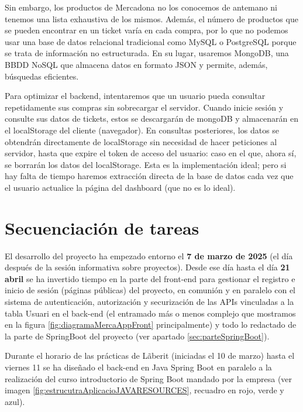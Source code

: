 \documentclass[a4paper,12pt]{report}
\begin{document}
		Sin embargo, los productos de Mercadona no los conocemos de antemano ni tenemos una lista exhaustiva de los mismos. Además, el número de productos que se pueden encontrar en un ticket varía en cada compra, por lo que no podemos usar una base de datos relacional tradicional como MySQL o PostgreSQL porque se trata de información no estructurada. En su lugar, usaremos MongoDB, una BBDD NoSQL que almacena datos en formato JSON y permite, además, búsquedas eficientes.
		
		Para optimizar el backend, intentaremos que un usuario pueda consultar repetidamente sus compras sin sobrecargar el servidor. Cuando inicie sesión y consulte sus datos de tickets, estos se descargarán de mongoDB y almacenarán en el localStorage del cliente (navegador). En consultas posteriores, los datos se obtendrán directamente de localStorage sin necesidad de hacer peticiones al servidor, hasta que expire el token de acceso del usuario: caso en el que, ahora sí, se borrarán los datos del localStorage. Esta es la implementación ideal; pero si hay falta de tiempo haremos extracción directa de la base de datos cada vez que el usuario actualice la página del dashboard (que no es lo ideal).
		



		
		\section{Secuenciación de tareas}
		
		El desarrollo del proyecto ha empezado entorno el \textbf{7 de marzo de 2025} (el día después de la sesión informativa sobre proyectos). Desde ese día hasta el día \textbf{21 abril} se ha invertido tiempo en la parte del front-end para gestionar el registro e inicio de sesión (páginas públicas) del proyecto, en comunión y en paralelo con el sistema de autenticación, autorización y securización de las APIs vinculadas a la tabla Usuari en el back-end (el entramado más o menos complejo que mostramos en la figura \ref{fig:diagramaMercaAppFront} principalmente) y todo lo redactado de la parte de SpringBoot del proyecto (ver apartado \ref{sec:parteSpringBoot}).
		
		Durante el horario de las prácticas de Lãberit (iniciadas el 10 de marzo) hasta el viernes 11 se ha diseñado el back-end en Java Spring Boot en paralelo a la realización del curso introductorio de Spring Boot mandado por la empresa (ver imagen \ref{fig:estrucutraAplicacioJAVARESOURCES}, recuadro en rojo, verde y azul).
		
\end{document}
